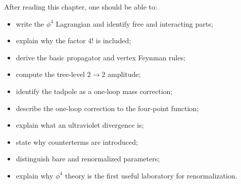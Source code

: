 After reading this chapter, one should be able to:
\begin{itemize}
    \item write the \(\phi^4\) Lagrangian and identify free and interacting
    parts;
    \item explain why the factor \(4!\) is included;
    \item derive the basic propagator and vertex Feynman rules;
    \item compute the tree-level \(2\to2\) amplitude;
    \item identify the tadpole as a one-loop mass correction;
    \item describe the one-loop correction to the four-point function;
    \item explain what an ultraviolet divergence is;
    \item state why counterterms are introduced;
    \item distinguish bare and renormalized parameters;
    \item explain why \(\phi^4\) theory is the first useful laboratory for
    renormalization.
\end{itemize}
